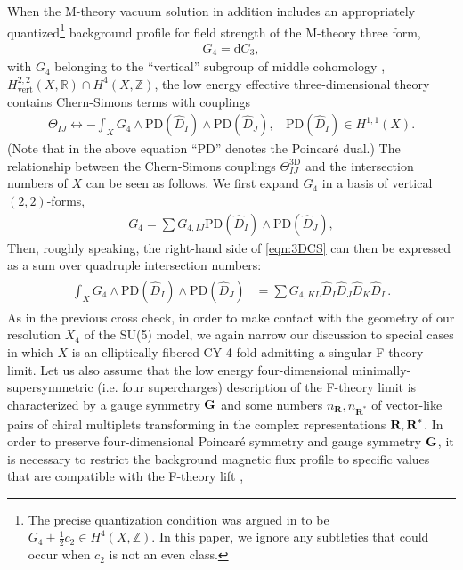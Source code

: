 \documentclass[11pt,oneside,english]{article}
\numberwithin{equation}{section}
\theoremstyle{definition}
\begin{document}
When the M-theory vacuum solution in addition includes an appropriately quantized\footnote{The precise quantization condition was argued in \cite{Witten:1996md} to be $G_4 + \frac{1}{2} c_2 \in H^4(X,\mathbb Z)$. In this paper, we ignore any subtleties that could occur when $c_2$ is not an even class.} background profile for field strength of the M-theory three form,
	\begin{align}
	\label{eqn:G4}
		G_4 = \mathrm{d}C_3,
	\end{align}
 with $G_4$ belonging to the ``vertical'' subgroup of middle cohomology \cite{Greene:1993vm}, $H_{\text{vert}}^{2,2}(X,\mathbb R) \cap H^4(X,\mathbb Z)$,  the low energy effective three-dimensional theory contains Chern-Simons terms with couplings \cite{Grimm:2011sk,Cvetic:2012xn}
 	\begin{align}
	\label{eqn:3DCS}
		\Theta_{IJ} \longleftrightarrow- \int_X G_4 \wedge \text{PD}(\hat D_I) \wedge \text{PD}(\hat D_J),~~~~ \text{PD}(\hat D_I) \in H^{1,1}(X).
	\end{align}
(Note that in the above equation ``PD'' denotes the Poincar\'e dual.) The relationship between the Chern-Simons couplings $\Theta^{\text{3D}}_{IJ}$ and the intersection numbers of $X$ can be seen as follows. We first expand $G_4$ in a basis of vertical $(2,2)$-forms,
	\begin{align}
	\label{eqn:verticalG}
		G_4 = \sum G_{4,IJ} \text{PD}(\hat D_I) \wedge \text{PD}(\hat D_J),
	\end{align}
Then, roughly speaking, the right-hand side of \cref{eqn:3DCS} can then be expressed as a sum over quadruple intersection numbers:
	\begin{align}
	\begin{split}
	\label{eqn:fluxintegral}
		\int_X G_4 \wedge \text{PD}(\hat D_I) \wedge \text{PD}(\hat D_J)&= \sum G_{4,KL} \hat D_I  \hat D_J  \hat D_{K}  \hat D_L. 
	\end{split}
	\end{align}
As in the previous cross check, in order to make contact with the geometry of our resolution $X_4$ of the SU(5) model, we again narrow our discussion to special cases in which $X$ is an elliptically-fibered CY 4-fold admitting a singular F-theory limit. Let us also assume that the low energy four-dimensional minimally-supersymmetric (i.e. four supercharges) description of the F-theory limit is characterized by a gauge symmetry $\textbf G$ and some numbers $n_{\textbf{R}}, n_{\textbf{R}^*}$ of vector-like pairs of chiral multiplets transforming in the complex representations $\textbf R, \textbf R^*$. In order to preserve four-dimensional Poincar\'e symmetry and gauge symmetry $\textbf G$, it is necessary to restrict the background magnetic flux profile to specific values that are compatible with the F-theory lift \cite{Dasgupta:1999ss,Donagi:2008ca},
\end{document}
